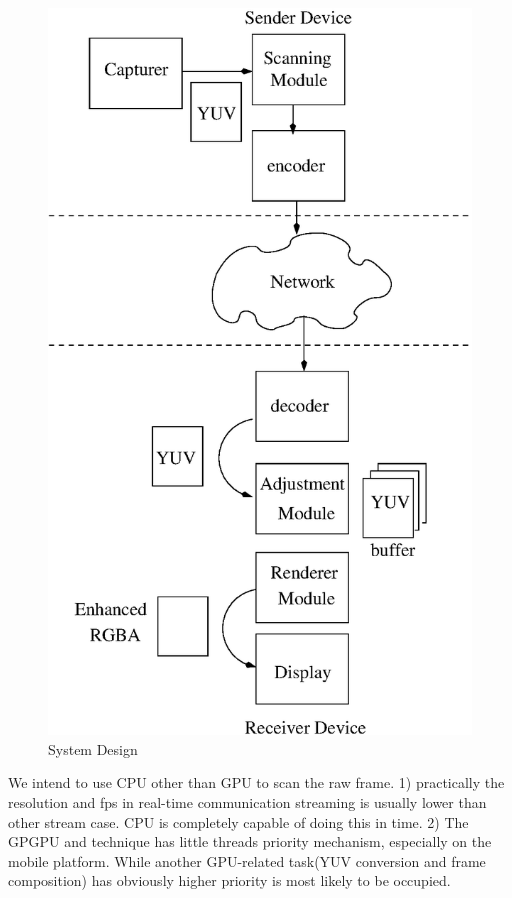 \begin{figure}[!htb]
  \centering
  \label{fig:design}
  \includegraphics[scale=.5]{./figures/design.eps}
  \caption{System Design}
\end{figure}

We intend to use CPU other than GPU to scan the raw frame. 1)
practically the resolution and fps in real-time communication
streaming is usually lower than other stream case. CPU is completely
capable of doing this in time. 2) The GPGPU and technique has little
threads priority mechanism, especially on the mobile platform. While
another GPU-related task(YUV conversion and frame composition) has
obviously higher priority is most likely to be occupied. 


